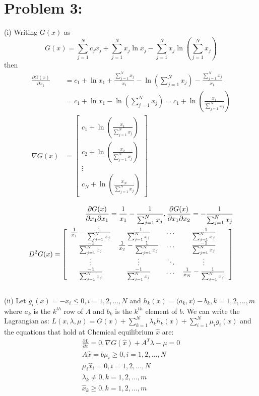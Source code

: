 \documentclass[12pt]{report}
\begin{document}
\section*{Problem 3:}
(i) Writing $G(x)$ as $$G(x)=\sum_{j=1}^{N} c_j x_j +\sum_{j=1}^{N} x_j \ln x_j - \sum_{j=1}^{N} x_j \ln \left(\sum_{j=1}^{N} x_j 
\right) $$ then
\begin{align*}
\frac{\partial G(x)}{\partial x_1}&=
c_1 + \ln x_1+\frac{\sum_{j=1}^{N}x_j}{x_1}-\ln\left(\sum_{j=1}^{N}x_j\right)-\frac{\sum_{j=1}^{N}x_j}{x_1}\\
&= c_1 + \ln x_1-\ln\left(\sum_{j=1}^{N}x_j\right) = c_1 + \ln \left( \frac{x_1}{\sum_{j=1}^{N}x_j} \right)\\
\nabla G(x)&= \left[ \begin{array}{c}
c_1 + \ln \left(\frac{x_1}{\sum_{j=1}^{N}x_j}\right) \\
c_2 + \ln \left(\frac{x_2}{\sum_{j=1}^{N}x_j}\right) \\
\vdots\\
c_N + \ln \left(\frac{x_N}{\sum_{j=1}^{N}x_j}\right)
\end{array} \right]
\end{align*}

\begin{align*}
\frac{\partial G(x)}{\partial x_1 \partial x_1} = \frac{1}{x_1} - \frac{1}{\sum_{j=1}^{N}x_j}, 
\frac{\partial G(x)}{\partial x_1 \partial x_2} = -\frac{1}{\sum_{j=1}^{N}x_j} \\
D^2G(x) = \left[ \begin{array}{c c c c}
\frac{1}{x_1}-\frac{1}{\sum_{j=1}^{N}x_j} & \frac{-1}{\sum_{j=1}^{N}x_j} & \dots & \frac{-1}{\sum_{j=1}^{N}x_j} \\
\frac{-1}{\sum_{j=1}^{N}x_j} & \frac{1}{x_2}-\frac{1}{\sum_{j=1}^{N}x_j} & \dots & \frac{-1}{\sum_{j=1}^{N}x_j} \\
\vdots & \vdots & \ddots & \vdots \\
\frac{-1}{\sum_{j=1}^{N}x_j} & \frac{-1}{\sum_{j=1}^{N}x_j} & \dots & \frac{1}{x_N}-\frac{1}{\sum_{j=1}^{N}x_j}
\end{array} \right]
\end{align*}
\\
(ii) Let $g_i(x) = -x_i \leq 0, i=1,2,\dots ,N$ and $h_k(x) = \langle a_k,x \rangle - b_k, k=1,2,\dots ,m$ where $a_k$ is the
$k^{th}$  row of $A$ and $b_k$ is the $k^{th}$ element of $b$. We can write the Lagrangian as:
$L(x,\lambda,\mu) = G(x) + \sum_{k=1}^N \lambda_k h_k(x) + \sum_{i=1}^N \mu_i g_i(x)$ and the equations that hold at Chemical
equilibrium $\hat{x}$ are:
\begin{align*}
\frac{\partial L}{\partial x }=0, \nabla G(\hat{x})+A^T\lambda-\mu = 0 \\
A\hat{x} = b
\mu_i \geq 0, i=1,2,\dots ,N \\
\mu_i \hat{x}_i = 0 , i=1,2,\dots ,N \\
\lambda_k \neq 0, k=1,2,\dots ,m \\
\hat{x}_k \geq 0, k=1,2,\dots ,m
\end{align*}
\end{document}
